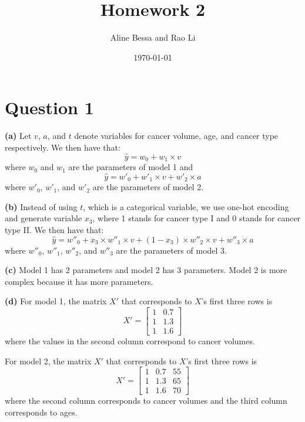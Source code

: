 \documentclass[leqno]{article}
\title{Homework 2}
\author{Aline Bessa and Rao Li}
\date\today
\begin{document}
\maketitle %

\section*{Question 1}

\textbf{(a)} Let $v$, $a$, and $t$ denote variables for cancer volume, age, and cancer type respectively. We then have that:
\begin{equation*}
\hat{y} = w_0 + w_1 \times v
\end{equation*}
where $w_0$ and $w_1$ are the parameters of model 1 and
\begin{equation*}
\hat{y} = w'_0 + w'_1 \times v + w'_2 \times a
\end{equation*}
where $w'_0$, $w'_1$, and $w'_2$ are the parameters of model 2.

\hfill

\noindent \textbf{(b)} Instead of using $t$, which is a categorical variable, we use one-hot encoding and generate variable $x_3$, where 1 stands for cancer type I and 
0 stands for cancer type II. We then have that:
\begin{equation*}
\hat{y} = w''_0 + x_3 \times w''_1 \times v + (1 - x_3) \times w''_2 \times v  + w''_3 \times a 
\end{equation*}
where $w''_0$, $w''_1$, $w''_2$, and $w''_3$ are the parameters of model 3.

\hfill

\noindent \textbf{(c)} Model 1 has 2 parameters and model 2 has 3 parameters. Model 2 is more complex because it has more parameters.

\hfill

\noindent \textbf{(d)} For model 1, the matrix $X'$ that corresponds to $X$'s first three rows is
\[
X'=
  \begin{bmatrix}
    1 & 0.7 \\
    1 & 1.3 \\
    1 & 1.6
  \end{bmatrix}
\]
where the values in the second column correspond to cancer volumes.

\noindent For model 2, the matrix $X'$ that corresponds to $X$'s first three rows is
\[
X'=
  \begin{bmatrix}
    1 & 0.7 & 55 \\
    1 & 1.3 & 65 \\
    1 & 1.6 & 70
  \end{bmatrix}
\]
where the second column corresponds to cancer volumes and the third column corresponds to ages.
\end{document}
